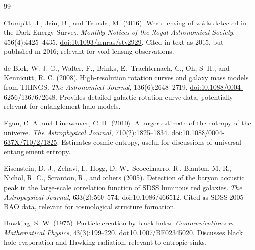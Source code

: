 \documentclass[11pt]{article}
\begin{document}
\begin{thebibliography}{99} 

Clampitt, J., Jain, B., and Takada, M. (2016).
\newblock Weak lensing of voids detected in the Dark Energy Survey.
\newblock \emph{Monthly Notices of the Royal Astronomical Society}, 456(4):4425--4435.
\newblock \href{https://doi.org/10.1093/mnras/stv2929}{doi:10.1093/mnras/stv2929}.
\newblock Cited in text as 2015, but published in 2016; relevant for void lensing observations.

de Blok, W. J. G., Walter, F., Brinks, E., Trachternach, C., Oh, S.-H., and Kennicutt, R. C. (2008).
\newblock High-resolution rotation curves and galaxy mass models from THINGS.
\newblock \emph{The Astronomical Journal}, 136(6):2648--2719.
\newblock \href{https://doi.org/10.1088/0004-6256/136/6/2648}{doi:10.1088/0004-6256/136/6/2648}.
\newblock Provides detailed galactic rotation curve data, potentially relevant for entanglement halo models.

Egan, C. A. and Lineweaver, C. H. (2010).
\newblock A larger estimate of the entropy of the universe.
\newblock \emph{The Astrophysical Journal}, 710(2):1825--1834.
\newblock \href{https://doi.org/10.1088/0004-637X/710/2/1825}{doi:10.1088/0004-637X/710/2/1825}.
\newblock Estimates cosmic entropy, useful for discussions of universal entanglement entropy.

Eisenstein, D. J., Zehavi, I., Hogg, D. W., Scoccimarro, R., Blanton, M. R., Nichol, R. C., Scranton, R., and others (2005).
\newblock Detection of the baryon acoustic peak in the large-scale correlation function of SDSS luminous red galaxies.
\newblock \emph{The Astrophysical Journal}, 633(2):560--574.
\newblock \href{https://doi.org/10.1086/466512}{doi:10.1086/466512}.
\newblock Cited as SDSS 2005 BAO data, relevant for cosmological structure formation.

Hawking, S. W. (1975).
\newblock Particle creation by black holes.
\newblock \emph{Communications in Mathematical Physics}, 43(3):199--220.
\newblock \href{https://doi.org/10.1007/BF02345020}{doi:10.1007/BF02345020}.
\newblock Discusses black hole evaporation and Hawking radiation, relevant to entropic sinks.


\end{thebibliography}
\end{document}
